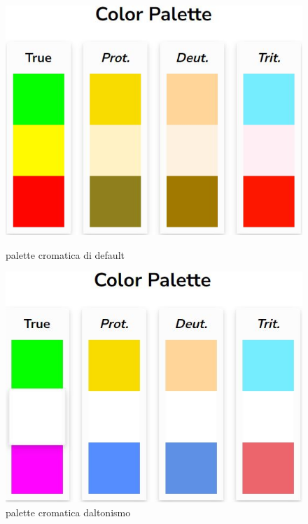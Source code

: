 \documentclass[binding=0.6cm]{sapthesis}
\begin{document}
\begin{figure}[h]
    \centering
    \begin{minipage}{0.48\textwidth}
      \includegraphics[width=\linewidth]{immagini/palette_cromatica.JPG}
      \caption{palette cromatica di default}
      \label{fig:palette_cromatica}
    \end{minipage}\hfill
    \begin{minipage}{0.48\textwidth}
      \includegraphics[width=\linewidth]{immagini/colorblind_palette.JPG}
      \caption{palette cromatica daltonismo}
      \label{fig:colorblind_palette}
    \end{minipage}
\end{figure}
\end{document}
